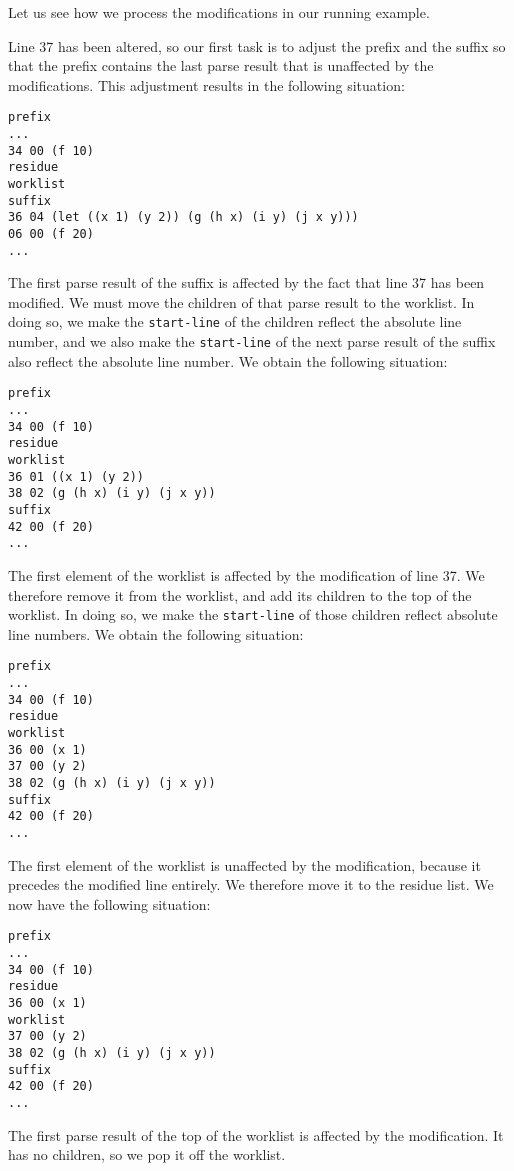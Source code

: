 Let us see how we process the modifications in our running example.

Line 37 has been altered, so our first task is to adjust the prefix
and the suffix so that the prefix contains the last parse result that
is unaffected by the modifications.  This adjustment results in the
following situation:

\begin{verbatim}
prefix
...
34 00 (f 10)
residue
worklist
suffix
36 04 (let ((x 1) (y 2)) (g (h x) (i y) (j x y)))
06 00 (f 20)
...
\end{verbatim}

The first parse result of the suffix is affected by the fact that line
37 has been modified.  We must move the children of that parse result
to the worklist.  In doing so, we make the \texttt{start-line} of the
children reflect the absolute line number, and we also make the
\texttt{start-line} of the next parse result of the suffix also
reflect the absolute line number.  We obtain the following situation:

\begin{verbatim}
prefix
...
34 00 (f 10)
residue
worklist
36 01 ((x 1) (y 2))
38 02 (g (h x) (i y) (j x y))
suffix
42 00 (f 20)
...
\end{verbatim}

The first element of the worklist is affected by the modification of
line 37.  We therefore remove it from the worklist, and add its
children to the top of the worklist.  In doing so, we make the
\texttt{start-line} of those children reflect absolute line numbers.
We obtain the following situation:

\begin{verbatim}
prefix
...
34 00 (f 10)
residue
worklist
36 00 (x 1)
37 00 (y 2)
38 02 (g (h x) (i y) (j x y))
suffix
42 00 (f 20)
...
\end{verbatim}

The first element of the worklist is unaffected by the modification,
because it precedes the modified line entirely.  We therefore move it
to the residue list.  We now have the following situation:

\begin{verbatim}
prefix
...
34 00 (f 10)
residue
36 00 (x 1)
worklist
37 00 (y 2)
38 02 (g (h x) (i y) (j x y))
suffix
42 00 (f 20)
...
\end{verbatim}

The first parse result of the top of the worklist is affected by the
modification.  It has no children, so we pop it off the worklist.

